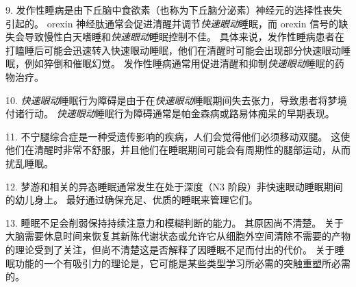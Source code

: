 9. 发作性睡病是由下丘脑中食欲素（也称为下丘脑分泌素）神经元的选择性丧失引起的。
orexin 神经肽通常会促进清醒并调节\textit{快速眼动}睡眠，而 orexin 信号的缺失会导致慢性白天嗜睡和\textit{快速眼动}睡眠控制不佳。
具体来说，发作性睡病患者在打瞌睡后可能会迅速转入快速眼动睡眠，他们在清醒时可能会出现部分快速眼动睡眠，例如猝倒和催眠幻觉。
发作性睡病通常用促进清醒和抑制\textit{快速眼动}睡眠的药物治疗。


10. \textit{快速眼动}睡眠行为障碍是由于在\textit{快速眼动}睡眠期间失去张力，导致患者将梦境付诸行动。
\textit{快速眼动}睡眠行为障碍通常是帕金森病或路易体痴呆的早期表现。


11. 不宁腿综合症是一种受遗传影响的疾病，人们会觉得他们必须移动双腿。
这使他们在清醒时非常不舒服，并且他们在睡眠期间可能会有周期性的腿部运动，从而扰乱睡眠。


12. 梦游和相关的异态睡眠通常发生在处于深度（N3 阶段）非快速眼动睡眠期间的幼儿身上。
最好通过确保充足、优质的睡眠来管理它们。


13. 睡眠不足会削弱保持持续注意力和模糊判断的能力。
其原因尚不清楚。
关于大脑需要休息时间来恢复其新陈代谢状态或允许它从细胞外空间清除不需要的产物的理论受到了关注，但尚不清楚这是否解释了因睡眠不足而付出的代价。
关于睡眠功能的一个有吸引力的理论是，它可能是某些类型学习所必需的突触重塑所必需的。


